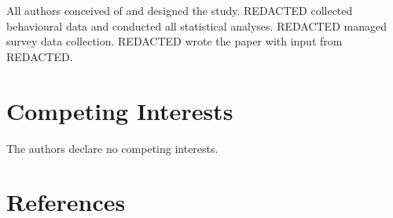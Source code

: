 \documentclass[
  man,floatsintext]{apa6}
\begin{document}
All authors conceived of and designed the study. REDACTED collected behavioural
data and conducted all statistical analyses. REDACTED managed survey data
collection. REDACTED wrote the paper with input from REDACTED.

\hypertarget{competing-interests}{%
\section{Competing Interests}\label{competing-interests}}

The authors declare no competing interests.

\newpage

\hypertarget{references}{%
\section{References}\label{references}}

\begingroup
\end{document}
